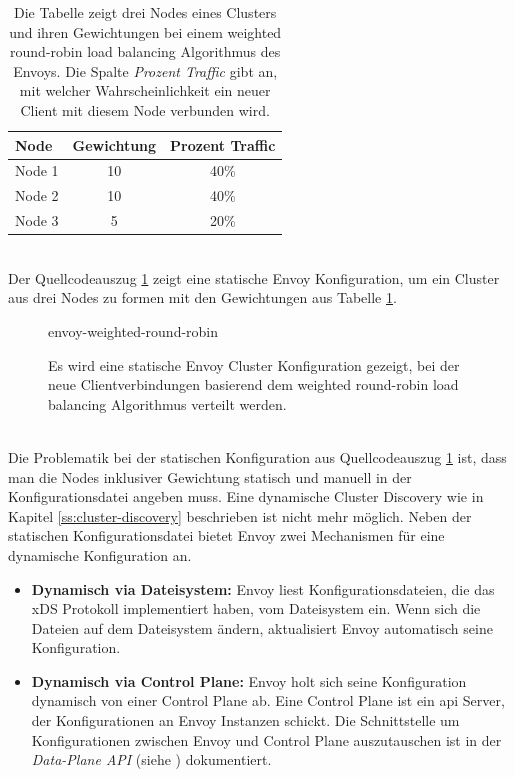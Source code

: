 \begin{table}[h!]
\centering
\renewcommand{\arraystretch}{1.5}
\begin{tabular}{|l|c|c|}
    \hline
    \textbf{Node} & \textbf{Gewichtung} & \textbf{Prozent Traffic} \\
    \hline
    \hline
    Node 1 & 10 & 40\% \\
    \hline
    Node 2 & 10 & 40\% \\
    \hline
    Node 3 & 5 & 20\% \\
    \hline
\end{tabular}
\caption{Die Tabelle zeigt drei Nodes eines Clusters und ihren Gewichtungen bei einem weighted round-robin load balancing Algorithmus des Envoys. Die Spalte \textit{Prozent Traffic} gibt an, mit welcher Wahrscheinlichkeit ein neuer Client mit diesem Node verbunden wird.}
\label{table:example-cluster-weight}
\end{table}
\\
Der Quellcodeauszug \ref{code:envoy-cluster-weight} zeigt eine statische Envoy Konfiguration, um ein Cluster aus drei Nodes zu formen mit den Gewichtungen aus Tabelle \ref{table:example-cluster-weight}.
\begin{figure}
    {envoy-weighted-round-robin}
    \caption{Es wird eine statische Envoy Cluster Konfiguration gezeigt, bei der neue Clientverbindungen basierend dem weighted round-robin load balancing Algorithmus verteilt werden.}
    \label{code:envoy-cluster-weight}
\end{figure}
\\
Die Problematik bei der statischen Konfiguration aus Quellcodeauszug \ref{code:envoy-cluster-weight} ist, dass man die Nodes inklusiver Gewichtung statisch und manuell in der Konfigurationsdatei angeben muss. Eine dynamische Cluster Discovery wie in Kapitel \ref{ss:cluster-discovery} beschrieben ist nicht mehr möglich.
Neben der statischen Konfigurationsdatei bietet Envoy zwei Mechanismen für eine dynamische Konfiguration an.
\begin{itemize}
  \item \textbf{Dynamisch via Dateisystem:} Envoy liest Konfigurationsdateien, die das xDS Protokoll implementiert haben, vom Dateisystem ein. Wenn sich die Dateien auf dem Dateisystem ändern, aktualisiert Envoy automatisch seine Konfiguration.
    \cite{ConfigurationDynamicFilesystem}
  \item \textbf{Dynamisch via Control Plane:} Envoy holt sich seine Konfiguration dynamisch von einer Control Plane ab. Eine Control Plane ist ein \ac{api} Server, der Konfigurationen an Envoy Instanzen schickt. Die Schnittstelle um Konfigurationen zwischen Envoy und Control Plane auszutauschen ist in der \textit{Data-Plane API} (siehe \cite{EnvoyproxyDataplaneapi2021}) dokumentiert.
    \cite{ConfigurationDynamicControl}
\end{itemize}
